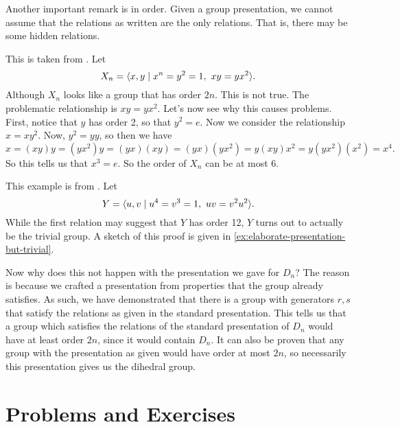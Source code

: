 \documentclass[./main.tex]{subfiles}
\begin{document}
Another important remark is in order. Given a group presentation, we cannot
assume that the relations as written are the only relations. That is, there may
be some hidden relations. 
\begin{example}
\label{example:hidden-relations-group}
    This is taken from \autocite[Eqn 1.2, \pno~26]{Dummit_Foote_2004}.
    Let 
    \[
        X_n = { \langle x, y \mid x^n = y^2 = 1, \,\, xy=yx^2 \rangle }. 
    \]
    Although $X_n$ looks like a group that has order $2n$. This is not true. The
    problematic relationship is $xy = yx^2$. Let's now see why this causes
    problems. First, notice that $y$ has order 2, so that $y^2 = e$. Now we
    consider the relationship $x = xy^2$. Now, $y^2 = yy$, so then we have
    \[
        x = (xy)y = (yx^2)y = (yx)(xy) = (yx)(yx^2) = y(xy)x^2 = y(yx^2)(x^2) = x^4.
    \]
    So this tells us that $x^3 = e$. So the order of $X_n$ can be at most 6. 
\end{example}

\begin{example}
\label{example:elaborate-presentation-but-trivial}
    This example is from \autocite[Eqn 1.3, \pno~27]{Dummit_Foote_2004}. Let 
    \[
        Y = { \langle u, v \mid u^4  = v^3 = 1, \,\, uv = v^2 u^2 \rangle }.
    \]
    While the first relation may suggest that $Y$ has order 12, $Y$ turns out to
    actually be the trivial group. A sketch of this proof is given in
    \cref{ex:elaborate-presentation-but-trivial}.
\end{example}

Now why does this not happen with the presentation we gave for $D_n$? The reason
is because we crafted a presentation from properties that the group already
satisfies. As such, we have demonstrated that there is a group with generators
$r, s$ that satisfy the relations as given in the standard presentation. This
tells us that a group which satisfies the relations of the standard presentation
of $D_n$ would have at least order $2n$, since it would contain $D_n$. It can
also be proven that any group with the presentation as given would have order at
most $2n$, so necessarily this presentation gives us the dihedral group. 

\section{Problems and Exercises}
\end{document}
